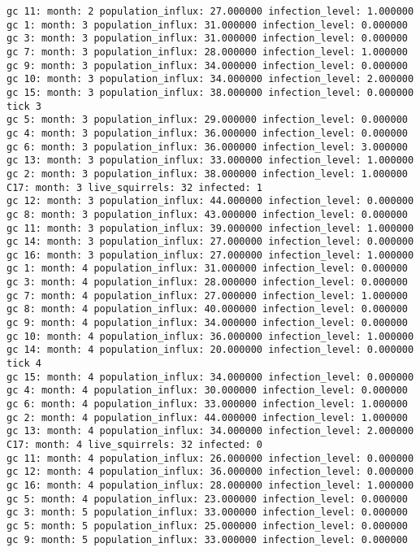 \begin{lstlisting}[basicstyle=\small]
gc 11: month: 2 population_influx: 27.000000 infection_level: 1.000000
gc 1: month: 3 population_influx: 31.000000 infection_level: 0.000000
gc 3: month: 3 population_influx: 31.000000 infection_level: 0.000000
gc 7: month: 3 population_influx: 28.000000 infection_level: 1.000000
gc 9: month: 3 population_influx: 34.000000 infection_level: 0.000000
gc 10: month: 3 population_influx: 34.000000 infection_level: 2.000000
gc 15: month: 3 population_influx: 38.000000 infection_level: 0.000000
tick 3
gc 5: month: 3 population_influx: 29.000000 infection_level: 0.000000
gc 4: month: 3 population_influx: 36.000000 infection_level: 0.000000
gc 6: month: 3 population_influx: 36.000000 infection_level: 3.000000
gc 13: month: 3 population_influx: 33.000000 infection_level: 1.000000
gc 2: month: 3 population_influx: 38.000000 infection_level: 1.000000
C17: month: 3 live_squirrels: 32 infected: 1
gc 12: month: 3 population_influx: 44.000000 infection_level: 0.000000
gc 8: month: 3 population_influx: 43.000000 infection_level: 0.000000
gc 11: month: 3 population_influx: 39.000000 infection_level: 1.000000
gc 14: month: 3 population_influx: 27.000000 infection_level: 0.000000
gc 16: month: 3 population_influx: 27.000000 infection_level: 1.000000
gc 1: month: 4 population_influx: 31.000000 infection_level: 0.000000
gc 3: month: 4 population_influx: 28.000000 infection_level: 0.000000
gc 7: month: 4 population_influx: 27.000000 infection_level: 1.000000
gc 8: month: 4 population_influx: 40.000000 infection_level: 0.000000
gc 9: month: 4 population_influx: 34.000000 infection_level: 0.000000
gc 10: month: 4 population_influx: 36.000000 infection_level: 1.000000
gc 14: month: 4 population_influx: 20.000000 infection_level: 0.000000
tick 4
gc 15: month: 4 population_influx: 34.000000 infection_level: 0.000000
gc 4: month: 4 population_influx: 30.000000 infection_level: 0.000000
gc 6: month: 4 population_influx: 33.000000 infection_level: 1.000000
gc 2: month: 4 population_influx: 44.000000 infection_level: 1.000000
gc 13: month: 4 population_influx: 34.000000 infection_level: 2.000000
C17: month: 4 live_squirrels: 32 infected: 0
gc 11: month: 4 population_influx: 26.000000 infection_level: 0.000000
gc 12: month: 4 population_influx: 36.000000 infection_level: 0.000000
gc 16: month: 4 population_influx: 28.000000 infection_level: 1.000000
gc 5: month: 4 population_influx: 23.000000 infection_level: 0.000000
gc 3: month: 5 population_influx: 33.000000 infection_level: 0.000000
gc 5: month: 5 population_influx: 25.000000 infection_level: 0.000000
gc 9: month: 5 population_influx: 33.000000 infection_level: 0.000000

\end{lstlisting}
